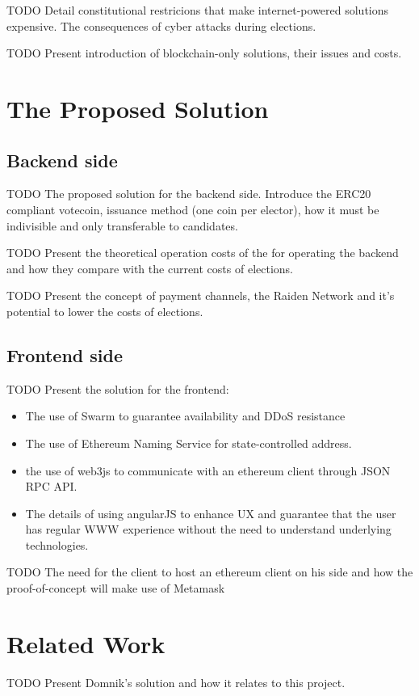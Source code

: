 \documentclass[twoside]{article}
\begin{document}
TODO Detail constitutional restricions that make internet-powered solutions expensive. The consequences of cyber attacks during elections.

TODO Present introduction of blockchain-only solutions, their issues and costs.



\section{The Proposed Solution}

\subsection{Backend side}
TODO The proposed solution for the backend side. Introduce the ERC20 compliant votecoin, issuance method (one coin per elector), how it must be indivisible and only transferable to candidates.
 
TODO Present the theoretical operation costs of the for operating the backend and how they compare with the current costs of elections.

TODO Present the concept of payment channels, the Raiden Network and it's potential to lower the costs of elections.

\subsection{Frontend side}
TODO Present the solution for the frontend:
\begin{itemize}
\item{The use of Swarm to guarantee availability and DDoS resistance}
\item{The use of Ethereum Naming Service for state-controlled address.}
\item{the use of web3js to communicate with an ethereum client through JSON RPC API.}
\item{The details of using angularJS to enhance UX and guarantee that the user has regular WWW experience without the need to understand underlying technologies.}
\end{itemize}

TODO The need for the client to host an ethereum client on his side and how the proof-of-concept will make use of Metamask




\section{Related Work}
TODO Present Domnik's solution and how it relates to this project.
\end{document}

